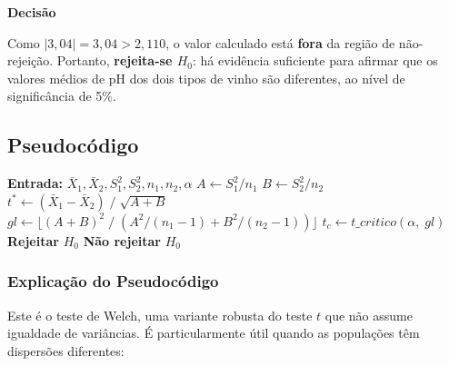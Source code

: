 \documentclass[12pt,a4paper]{article}
\begin{document}
\textbf{Decisão}

Como $|{3{,}04}| = 3{,}04 > 2{,}110$, o valor calculado está \textbf{fora}
da região de não-rejeição. Portanto, \textbf{rejeita-se $H_0$}: há
evidência suficiente para afirmar que os valores médios de pH dos dois tipos de vinho
são diferentes, ao nível de significância de 5\%.

\subsection*{Pseudocódigo}

\begin{algorithm}[H]
\caption{Teste $t^*$ -- Amostras Pequenas, Variâncias Diferentes (Welch)}
\begin{algorithmic}[1]
  \State \textbf{Entrada:} $\bar{X}_1, \bar{X}_2, S_1^2, S_2^2, n_1, n_2, \alpha$
  \State $A \gets S_1^2 / n_1$
  \State $B \gets S_2^2 / n_2$
  \State $t^* \gets (\bar{X}_1 - \bar{X}_2) \;/\; \sqrt{A + B}$
  \State $gl \gets \lfloor (A + B)^2 \;/\; (A^2/(n_1-1) + B^2/(n_2-1)) \rfloor$
  \State $t_c \gets t\_critico(\alpha,\; gl)$
    \State \textbf{Rejeitar} $H_0$
  \Else
    \State \textbf{Não rejeitar} $H_0$
  \EndIf
\end{algorithmic}
\end{algorithm}

\subsubsection*{Explicação do Pseudocódigo}

Este é o teste de Welch, uma variante robusta do teste $t$ que não assume igualdade de variâncias.
É particularmente útil quando as populações têm dispersões diferentes:
\end{document}
